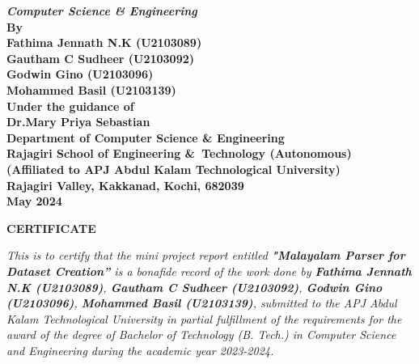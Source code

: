 \documentclass[12pt,a4paper,titlepage]{report}
\begin{document}
\begin{center}
		{\Large \bf \itshape{{Computer\; Science\; \&\; Engineering}}}\\[0.4cm]
		\large \bfseries{By}\\[.4cm]
		\large \bfseries{ Fathima Jennath N.K (U2103089) }\\[0.2cm]
		\large \bfseries{ Gautham C Sudheer (U2103092) }\\[0.2cm]
		\large \bfseries{ Godwin Gino (U2103096) }\\[0.2cm]
		\large \bfseries{ Mohammed Basil (U2103139) }\\[0.6cm]
		\large \bfseries{Under the guidance of}\\[0.75cm]
		\large \bfseries{Dr.Mary Priya Sebastian}\\[0.75cm]
		\large \textbf{Department of Computer\; Science\; \&\; Engineering}\\
		\large \textbf{Rajagiri School of Engineering \&\ Technology (Autonomous)}\\
		\small \bfseries{(Affiliated to APJ Abdul Kalam Technological University)}\\
		\large \textbf{Rajagiri Valley, Kakkanad, Kochi, 682039}\\
		\large \bfseries{May 2024}
	\end{center}
	
	\newpage
	\thispagestyle{empty}
	\begin{center}
		
		\large \bfseries{\huge{CERTIFICATE}}\\[5cm]
	\end{center}
	
	\renewcommand{\baselinestretch}{1.2}\normalsize
	
	\emph{This is to certify that the mini project report entitled \textbf{"Malayalam Parser for Dataset Creation”} is a bonafide record of the work done by \textbf{Fathima Jennath N.K (U2103089)}, \textbf{Gautham C Sudheer (U2103092)}, \textbf{Godwin Gino (U2103096)}, \textbf{Mohammed Basil (U2103139)}, submitted to the APJ Abdul Kalam Technological University in 
		partial fulfillment of the requirements for the award of the degree of Bachelor of Technology (B. Tech.) in Computer Science and Engineering during the academic year 2023-2024.}\\[2.5cm]
	
\end{document}
